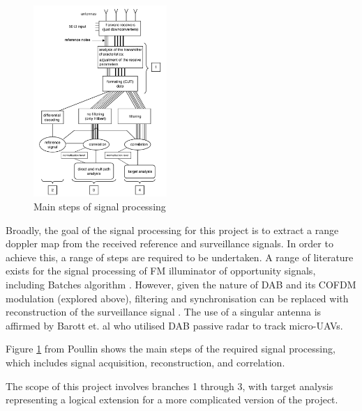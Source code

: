 \documentclass[12pt,a4paper]{article}
\begin{document}
\begin{figure} %
    \centering
    \includegraphics[width=0.45\textwidth]{DSPprocess.png}
    \caption{Main steps of signal processing \cite{detectionDABmodulation}}
    \label{fig:DSP}
\end{figure}

Broadly, the goal of the signal processing for this project is to extract a range doppler map from the received reference and surveillance signals. In order to achieve this, a range of steps are required to be undertaken. A range of literature exists for the signal processing of FM illuminator of opportunity signals, including Batches algorithm \cite{DSPfm}. However, given the nature of DAB and its COFDM modulation (explored above), filtering and synchronisation can be replaced with reconstruction of the surveillance signal \cite{DSPdab}. The use of a singular antenna is affirmed by Barott et. al \cite{DABsingleRadar} who utilised DAB passive radar to track micro-UAVs.

\par \vspace{0.5cm} 
\noindent Figure \ref{fig:DSP} from Poullin \cite{detectionDABmodulation} shows the main steps of the required signal processing, which includes signal acquisition, reconstruction, and correlation. 

\par \vspace{0.5cm} 
\noindent The scope of this project involves branches 1 through 3, with target analysis representing a logical extension for a more complicated version of the project. 
\par \vspace{0.5cm} 
\end{document}
